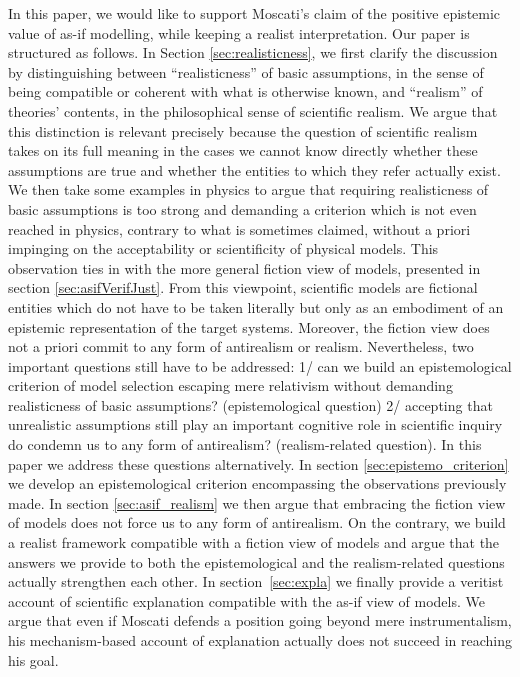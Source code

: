 \documentclass[a4paper,11pt]{article}
\theoremstyle{definition}
\begin{document}
In this paper, we would like to support Moscati's claim of the positive epistemic value of as-if modelling, while keeping a realist interpretation. Our paper is structured as follows. In Section \ref{sec:realisticness}, we first clarify the discussion by distinguishing between “realisticness” of basic assumptions, in the sense of being compatible or coherent with what is otherwise known, and “realism” of theories’ contents, in the philosophical sense of scientific realism. We argue that this distinction is relevant precisely because the question of scientific realism takes on its full meaning in the cases we cannot know directly whether these assumptions are true and whether the entities to which they refer actually exist. We then take some examples in physics to argue that requiring realisticness of basic assumptions is too strong and demanding a criterion which is not even reached in physics, contrary to what is sometimes claimed, without a priori impinging on the acceptability or scientificity of physical models. This observation ties in with the more general fiction view of models, presented in section \ref{sec:asifVerifJust}. From this viewpoint, scientific models are fictional entities which do not have to be taken literally but only as an embodiment of an epistemic representation of the target systems. Moreover, the fiction view does not a priori commit to any form of antirealism or realism. Nevertheless, two important questions still have to be addressed: 1/ can we build an epistemological criterion of model selection escaping mere relativism without demanding realisticness of basic assumptions? (epistemological question) 2/ accepting that unrealistic assumptions still play an important cognitive role in scientific inquiry do condemn us to any form of antirealism? (realism-related question). In this paper we address these questions alternatively. In section \ref{sec:epistemo_criterion} we develop an epistemological criterion encompassing the observations previously made. In section \ref{sec:asif_realism} we then argue that embracing the fiction view of models does not force us to any form of antirealism. On the contrary, we build a realist framework compatible with a fiction view of models and argue that the answers we provide to both the epistemological and the realism-related questions actually strengthen each other. In section~\ref{sec:expla} we finally provide a veritist account of scientific explanation compatible with the as-if view of models. We argue that even if Moscati defends a position going beyond mere instrumentalism, his mechanism-based account of explanation actually does not succeed in reaching his goal. 
\end{document}
